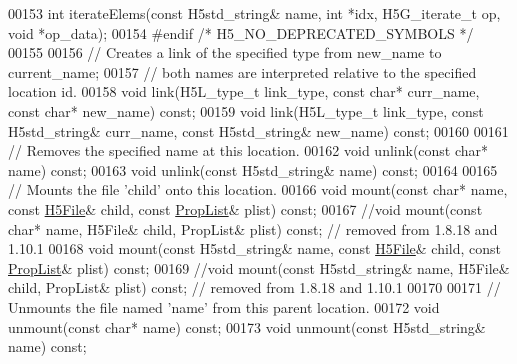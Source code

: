 \begin{DoxyCode}
00153         \textcolor{keywordtype}{int} iterateElems(\textcolor{keyword}{const} H5std\_string& name, \textcolor{keywordtype}{int} *idx, H5G\_iterate\_t op, \textcolor{keywordtype}{void} *op\_data);
00154 \textcolor{preprocessor}{#endif }\textcolor{comment}{/* H5\_NO\_DEPRECATED\_SYMBOLS */}\textcolor{preprocessor}{}
00155 
00156         \textcolor{comment}{// Creates a link of the specified type from new\_name to current\_name;}
00157         \textcolor{comment}{// both names are interpreted relative to the specified location id.}
00158         \textcolor{keywordtype}{void} link(H5L\_type\_t link\_type, \textcolor{keyword}{const} \textcolor{keywordtype}{char}* curr\_name, \textcolor{keyword}{const} \textcolor{keywordtype}{char}* new\_name) \textcolor{keyword}{const};
00159         \textcolor{keywordtype}{void} link(H5L\_type\_t link\_type, \textcolor{keyword}{const} H5std\_string& curr\_name, \textcolor{keyword}{const} H5std\_string& new\_name) \textcolor{keyword}{const};
00160 
00161         \textcolor{comment}{// Removes the specified name at this location.}
00162         \textcolor{keywordtype}{void} unlink(\textcolor{keyword}{const} \textcolor{keywordtype}{char}* name) \textcolor{keyword}{const};
00163         \textcolor{keywordtype}{void} unlink(\textcolor{keyword}{const} H5std\_string& name) \textcolor{keyword}{const};
00164 
00165         \textcolor{comment}{// Mounts the file 'child' onto this location.}
00166         \textcolor{keywordtype}{void} mount(\textcolor{keyword}{const} \textcolor{keywordtype}{char}* name, \textcolor{keyword}{const} \hyperlink{class_h5_1_1_h5_file}{H5File}& child, \textcolor{keyword}{const} \hyperlink{class_h5_1_1_prop_list}{PropList}& plist) \textcolor{keyword}{const};
00167         \textcolor{comment}{//void mount(const char* name, H5File& child, PropList& plist) const; // removed from 1.8.18 and
       1.10.1}
00168         \textcolor{keywordtype}{void} mount(\textcolor{keyword}{const} H5std\_string& name, \textcolor{keyword}{const} \hyperlink{class_h5_1_1_h5_file}{H5File}& child, \textcolor{keyword}{const} 
      \hyperlink{class_h5_1_1_prop_list}{PropList}& plist) \textcolor{keyword}{const};
00169         \textcolor{comment}{//void mount(const H5std\_string& name, H5File& child, PropList& plist) const; // removed from
       1.8.18 and 1.10.1}
00170 
00171         \textcolor{comment}{// Unmounts the file named 'name' from this parent location.}
00172         \textcolor{keywordtype}{void} unmount(\textcolor{keyword}{const} \textcolor{keywordtype}{char}* name) \textcolor{keyword}{const};
00173         \textcolor{keywordtype}{void} unmount(\textcolor{keyword}{const} H5std\_string& name) \textcolor{keyword}{const};

\end{DoxyCode}
